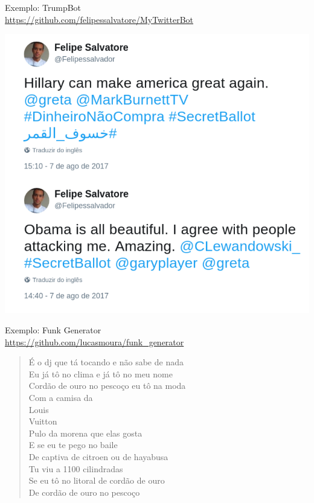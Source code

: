 \documentclass[10pt]{beamer}
\begin{document}
\begin{frame}{Exemplo: TrumpBot\\\url{https://github.com/felipessalvatore/MyTwitterBot}}
\begin{center}
\includegraphics[scale=0.24]{images/TrumpBot.png}
\end{center}
\end{frame}


\begin{frame}{Exemplo: Funk Generator\\ \url{https://github.com/lucasmoura/funk_generator}}
\begin{quote}
\centering
É o dj que tá tocando e não sabe de nada\\ 
Eu já tô no clima e já tô no meu nome \\
Cordão de ouro no pescoço eu tô na moda \\
Com a camisa da \\
Louis \\
Vuitton \\
Pulo da morena que elas gosta\\ 
E se eu te pego no baile \\
De captiva de citroen ou de hayabusa\\ 
Tu viu a 1100 cilindradas \\
Se eu tô no litoral de cordão de ouro\\ 
De cordão de ouro no pescoço\\
\end{quote}
\end{frame}
\end{document}
